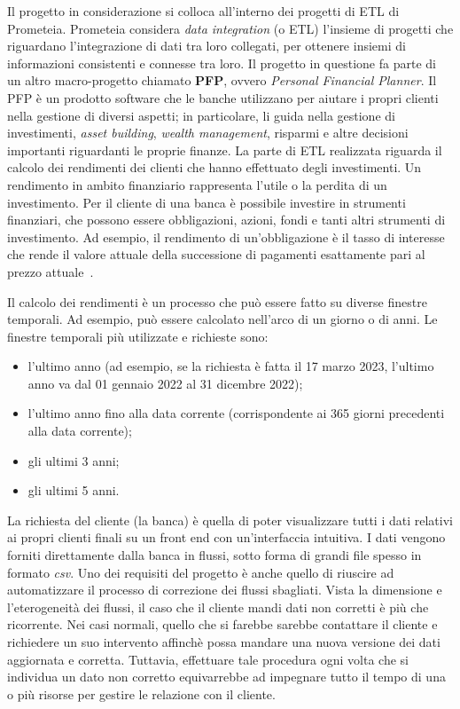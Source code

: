 Il progetto in considerazione si colloca all'interno dei progetti di ETL di Prometeia.
Prometeia considera \textit{data integration} (o ETL) l'insieme di progetti che riguardano l'integrazione di dati tra loro collegati, per ottenere insiemi di informazioni consistenti e connesse tra loro.
Il progetto in questione fa parte di un altro macro-progetto chiamato \textbf{PFP}, ovvero \textit{Personal Financial Planner}.
Il PFP è un prodotto software che le banche utilizzano per aiutare i propri clienti nella gestione di diversi aspetti;
in particolare, li guida nella gestione di investimenti, \textit{asset building}, \textit{wealth management}, risparmi e altre decisioni importanti riguardanti le proprie finanze.
La parte di ETL realizzata riguarda il calcolo dei rendimenti dei clienti che hanno effettuato degli investimenti.
Un rendimento in ambito finanziario rappresenta l'utile o la perdita di un investimento.
Per il cliente di una banca è possibile investire in strumenti finanziari, che possono essere obbligazioni, azioni, fondi e tanti altri strumenti di investimento.
Ad esempio, il rendimento di un'obbligazione è il tasso di interesse che rende il valore attuale della successione di pagamenti esattamente pari al prezzo attuale~\cite{rendimenti}.

Il calcolo dei rendimenti è un processo che può essere fatto su diverse finestre temporali.
Ad esempio, può essere calcolato nell'arco di un giorno o di anni.
Le finestre temporali più utilizzate e richieste sono:
\begin{itemize}
    \item l'ultimo anno (ad esempio, se la richiesta è fatta il 17 marzo 2023, l’ultimo anno va dal 01 gennaio 2022 al 31 dicembre 2022);
    \item l'ultimo anno fino alla data corrente (corrispondente ai 365 giorni precedenti alla data corrente);
    \item gli ultimi 3 anni;
    \item gli ultimi 5 anni.
\end{itemize}

La richiesta del cliente (la banca) è quella di poter visualizzare tutti i dati relativi ai propri clienti finali su un front end con un'interfaccia intuitiva.
I dati vengono forniti direttamente dalla banca in flussi, sotto forma di grandi file spesso in formato \textit{csv}.
Uno dei requisiti del progetto è anche quello di riuscire ad automatizzare il processo di correzione dei flussi sbagliati.
Vista la dimensione e l'eterogeneità dei flussi, il caso che il cliente mandi dati non corretti è più che ricorrente.
Nei casi normali, quello che si farebbe sarebbe contattare il cliente e richiedere un suo intervento affinchè possa mandare una nuova versione dei dati aggiornata e corretta.
Tuttavia, effettuare tale procedura ogni volta che si individua un dato non corretto equivarrebbe ad impegnare tutto il tempo di una o più risorse per gestire le relazione con il cliente.

